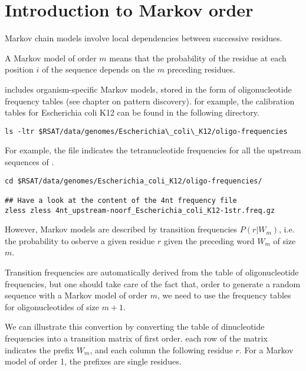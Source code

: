 \section{Introduction to Markov order}

Markov chain models involve local dependencies between successive
residues.

A Markov model of order $m$ means that the
probability of the residue at each position $i$ of the sequence
depends on the $m$ preceding residues.

\RSAT includes organism-specific Markov models, stored in the form of
oligonucleotide frequency tables (see chapter on pattern
discovery). for example, the calibration tables for Escherichia coli
K12 can be found in the following directory.

\begin{small}
\begin{verbatim}
ls -ltr $RSAT/data/genomes/Escherichia\_coli\_K12/oligo-frequencies
\end{verbatim}
\end{small}

For example, the file
indicates the tetranucleotide frequencies for all the upstream
sequences of .

\begin{small}
\begin{verbatim}
cd $RSAT/data/genomes/Escherichia_coli_K12/oligo-frequencies/

## Have a look at the content of the 4nt frequency file
zless zless 4nt_upstream-noorf_Escherichia_coli_K12-1str.freq.gz

\end{verbatim}
\end{small}

However, Markov models are described by transition frequencies
$P(r|W_m)$, i.e. the probability to osberve a given residue $r$ given
the preceding word $W_m$ of size $m$.

Transition frequencies are automatically derived from the table of
oligonucleotide frequencies, but one should take care of the fact
that, order to generate a random sequence with a Markov model of order
$m$, we need to use the frequency tables for oligonucleotides of size
$m+1$.

We can illustrate this convertion by converting the table of
dinucleotide frequencies into a transition matrix of first order. each
row of the matrix indicates the prefix $W_m$, and each column the
following residue $r$. For a Markov model of order 1, the prefixes are
single residues.

